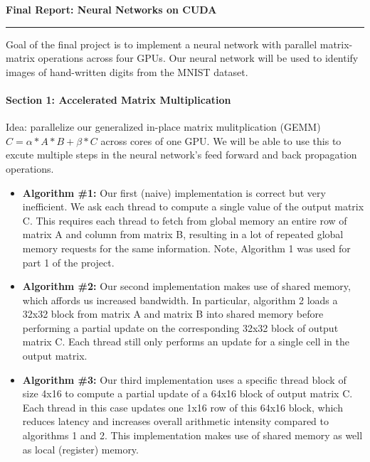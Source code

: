 \documentclass[12pt,letterpaper,twoside]{article}
\begin{document}
{\centering \textbf{Final Report: Neural Networks on CUDA\\}}
\vspace*{-8pt}\noindent\rule{\linewidth}{1pt}

Goal of the final project is to implement a neural network with parallel
matrix-matrix operations across four GPUs. Our neural network will be used
to identify images of hand-written digits from the MNIST dataset.

\paragraph{Section 1: Accelerated Matrix Multiplication} Idea: parallelize our generalized
in-place matrix mulitplication (GEMM) $C = \alpha*A*B + \beta*C$ across cores of one GPU. We
will be able to use this to excute multiple steps in the neural network's feed forward
and back propagation operations.

\begin{itemize}
    \item \textbf{Algorithm \#1:} Our first (naive) implementation is correct but
    very inefficient. We ask each thread to compute a single value of the output matrix
    C. This requires each thread to fetch from global memory an entire row of matrix A
    and column from matrix B, resulting in a lot of repeated global memory requests
    for the same information. Note, Algorithm 1 was used for part 1 of the project.

    \item \textbf{Algorithm \#2:} Our second implementation makes use of shared
    memory, which affords us increased bandwidth. In particular, algorithm 2
    loads a 32x32 block from matrix A and matrix B into shared memory before
    performing a partial update on the corresponding 32x32 block of output
    matrix C. Each thread still only performs an update for a single cell
    in the output matrix.

    \item \textbf{Algorithm \#3: } Our third implementation uses a specific
    thread block of size 4x16 to compute a partial update of a 64x16 block of
    output matrix C. Each thread in this case updates one 1x16 row of this
    64x16 block, which reduces latency and increases overall arithmetic intensity
    compared to algorithms 1 and 2. This implementation makes use of shared memory
    as well as local (register) memory.

\end{itemize}
\end{document}
